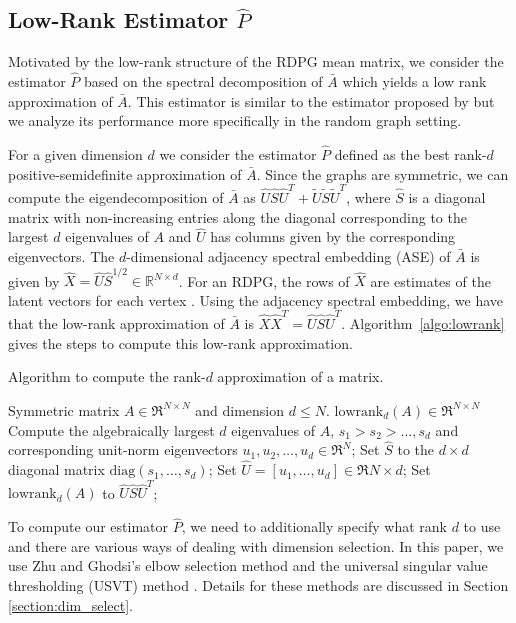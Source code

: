 \documentclass[10pt,letterpaper]{article}
\begin{document}
\subsection{Low-Rank Estimator $\hat{P}$}
\label{sec:phat}

Motivated by the low-rank structure of the RDPG mean matrix, we consider the estimator $\hat{P}$ based on the spectral decomposition of $\bar{A}$ which yields a low rank approximation of $\bar{A}$.
This estimator is similar to the estimator proposed by \citet{chatterjee2015matrix} but we analyze its performance more specifically in the random graph setting.

For a given dimension $d$ we consider the estimator $\hat{P}$ defined as the best rank-$d$ positive-semidefinite approximation of $\bar{A}$.
Since the graphs are symmetric, we can compute the eigendecomposition of $\bar{A}$ as $\hat{U} \hat{S} \hat{U}^T + \tilde{U}\tilde{S}\tilde{U}^T$, where $\hat{S}$ is a diagonal matrix with non-increasing entries along the diagonal corresponding to the largest $d$ eigenvalues of $A$ and $\hat{U}$ has columns given by the corresponding eigenvectors.
The $d$-dimensional adjacency spectral embedding (ASE) of $\bar{A}$ is given by $\hat{X}=\hat{U} \hat{S}^{1/2}\in \mathbb{R}^{N \times d}$.
For an RDPG, the rows of $\hat{X}$ are estimates of the latent vectors for each vertex \citep{sussman2014consistent}.
Using the adjacency spectral embedding, we have that the low-rank approximation of $\bar{A}$ is $\hat{X} \hat{X}^T=\hat{U}\hat{S}\hat{U}^T$.
Algorithm~\ref{algo:lowrank} gives the steps to compute this low-rank approximation.

\begin{algorithm}[H]
\caption{Algorithm to compute the rank-$d$ approximation of a matrix.}
\label{algo:lowrank}
\begin{algorithmic}[1]
\REQUIRE Symmetric matrix $A\in \Re^{N\times N}$ and dimension $d\leq N$.
\ENSURE $\mathrm{lowrank}_d(A)\in \Re^{N\times N}$
\STATE Compute the algebraically largest $d$ eigenvalues of $A$, $s_1>s_2>\dotsc,s_d$ and corresponding unit-norm eigenvectors $u_1,u_2,\dotsc,u_d\in \Re^N$;
\STATE Set $\hat{S}$ to the $d\times d$ diagonal matrix $\mathrm{diag}(s_1,\dotsc,s_d)$;
\STATE Set $\hat{U} = [u_1,\dotsc,u_d]\in \Re{N\times d}$;
\STATE Set $\mathrm{lowrank}_d(A)$ to $\hat{U}\hat{S}\hat{U}^T$;
\end{algorithmic}
\end{algorithm}

To compute our estimator $\hat{P}$, we need to additionally specify what rank $d$ to use and there are various ways of dealing with dimension selection. 
In this paper, we use Zhu and Ghodsi's elbow selection method \cite{zhu2006automatic} and the universal singular value thresholding (USVT) method \cite{chatterjee2015matrix}. 
Details for these methods are discussed in Section \ref{section:dim_select}.
\end{document}
